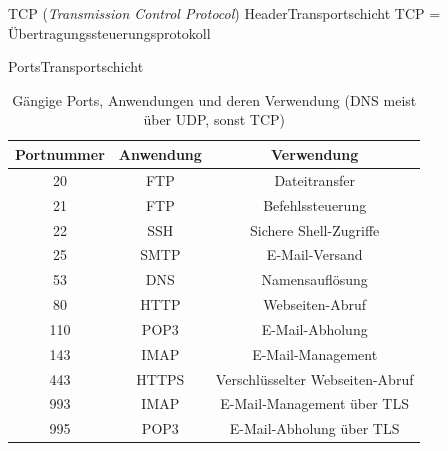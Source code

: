 \begin{frame}[fragile]{\faBoxOpen{} \acrshort{TCP} (\textit{Transmission Control Protocol}) Header}{Transportschicht}
    \acrshort{TCP} = Übertragungssteuerungsprotokoll
    \begin{table}[H]
        \centering
        
    \end{table}
\end{frame}

\begin{frame}[fragile]{\faShip{} Ports}{Transportschicht}
    \begin{table}[H]
        \centering
        \footnotesize
        \begin{tabular}{ccc}
            \textbf{Portnummer} & \textbf{Anwendung} & \textbf{Verwendung}             \\
            \midrule
            20                  & \acrshort{FTP}                & Dateitransfer                   \\
            21                  & \acrshort{FTP}                & Befehlssteuerung                \\
            22                  & \acrshort{SSH}                & Sichere Shell-Zugriffe          \\
            25                  & \acrshort{SMTP}               & E-Mail-Versand                  \\
            53                  & \acrshort{DNS}                & Namensauflösung                 \\
            80                  & \acrshort{HTTP}               & Webseiten-Abruf                 \\
            110                 & \acrshort{POP3}               & E-Mail-Abholung                 \\
            143                 & \acrshort{IMAP}               & E-Mail-Management               \\
            443                 & \acrshort{HTTPS}              & Verschlüsselter Webseiten-Abruf \\
            993                 & \acrshort{IMAP}               & E-Mail-Management über \acrshort{TLS}      \\
            995                 & \acrshort{POP3}               & E-Mail-Abholung über \acrshort{TLS}        \\
        \end{tabular}
        \caption*{Gängige Ports, Anwendungen und deren Verwendung (\acrshort{DNS} meist über \acrshort{UDP}, sonst \acrshort{TCP})}
    \end{table}
\end{frame}


